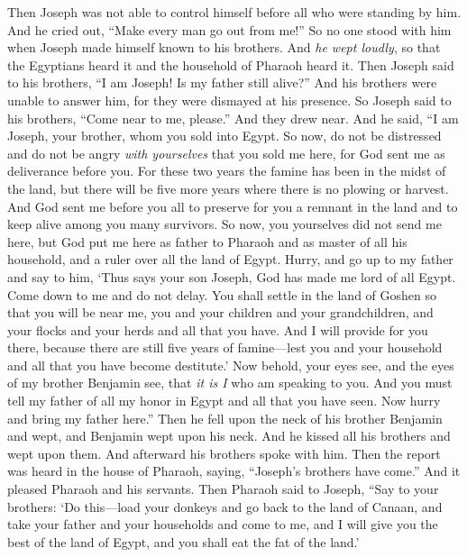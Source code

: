 \begin{biblechapter} %
 Then Joseph was not able to control himself before all who were standing by him. And he cried out, “Make every man go out from me!” So no one stood with him when Joseph made himself known to his brothers.
\verse And \textit{he wept loudly}, so that the Egyptians heard it and the household of Pharaoh heard it.
\verse Then Joseph said to his brothers, “I am Joseph! Is my father still alive?” And his brothers were unable to answer him, for they were dismayed at his presence.
\verse So Joseph said to his brothers, “Come near to me, please.” And they drew near. And he said, “I am Joseph, your brother, whom you sold into Egypt.
\verse So now, do not be distressed and do not be angry \textit{with yourselves} that you sold me here, for God sent me as deliverance before you.
\verse For these two years the famine has been in the midst of the land, but there will be five more years where there is no plowing or harvest.
\verse And God sent me before you all to preserve for you a remnant in the land and to keep alive among you many survivors.
\verse So now, you yourselves did not send me here, but God put me here as father to Pharaoh and as master of all his household, and a ruler over all the land of Egypt.
\verse Hurry, and go up to my father and say to him, ‘Thus says your son Joseph, God has made me lord of all Egypt. Come down to me and do not delay.
\verse You shall settle in the land of Goshen so that you will be near me, you and your children and your grandchildren, and your flocks and your herds and all that you have.
\verse And I will provide for you there, because there are still five years of famine—lest you and your household and all that you have become destitute.’
\verse Now behold, your eyes see, and the eyes of my brother Benjamin see, that \textit{it is I} who am speaking to you.
\verse And you must tell my father of all my honor in Egypt and all that you have seen. Now hurry and bring my father here.”
\verse Then he fell upon the neck of his brother Benjamin and wept, and Benjamin wept upon his neck.
\verse And he kissed all his brothers and wept upon them. And afterward his brothers spoke with him.
\verse Then the report was heard in the house of Pharaoh, saying, “Joseph’s brothers have come.” And it pleased Pharaoh and his servants.
\verse Then Pharaoh said to Joseph, “Say to your brothers: ‘Do this—load your donkeys and go back to the land of Canaan,
\verse and take your father and your households and come to me, and I will give you the best of the land of Egypt, and you shall eat the fat of the land.’

\end{biblechapter}
